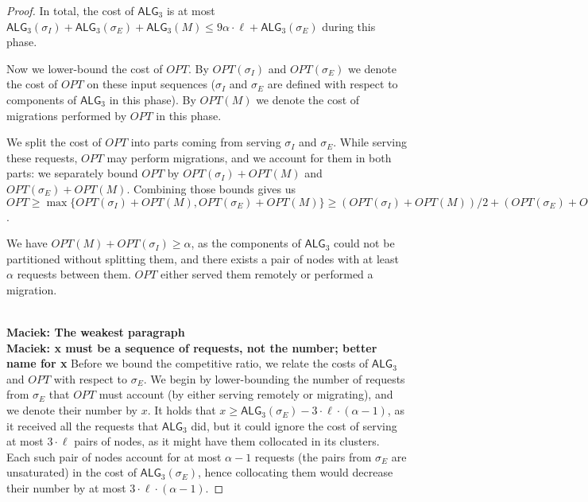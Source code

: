 \documentclass[manuscript,screen=true]{acmart}
\newcommand{\OPT}{\mathit{OPT}}
\newcommand{\TAlg}{{\ensuremath{\textsf{ALG}_{3}}}\xspace} %
\newcommand\maciek[1]{\color{brown}\textbf{\\ Maciek: #1}\color{black}}
\begin{document}
\begin{proof}
  In total, the cost of \TAlg is at most $\TAlg(\sigma_I) + \TAlg(\sigma_E) + \TAlg(M) \leq 9\alpha\cdot \ell + \TAlg(\sigma_E)$ during this phase.

  \medskip

  Now we lower-bound the cost of $\OPT$.
  By $\OPT(\sigma_I)$ and $\OPT(\sigma_E)$ we denote the cost of $\OPT$ on these input sequences ($\sigma_I$ and $\sigma_E$ are defined with respect to components of \TAlg in this phase).
  By $\OPT(M)$ we denote the cost of migrations performed by $\OPT$ in this phase.
  
  We split the cost of $\OPT$ into parts coming from serving $\sigma_I$ and $\sigma_E$.
  While serving these requests, $\OPT$ may perform migrations, and we account for them in both parts: we separately bound $\OPT$ by $\OPT(\sigma_I) + \OPT(M)$ and $\OPT(\sigma_E) + \OPT(M)$.
  Combining those bounds gives us $\OPT \geq \max\{\OPT(\sigma_I) + \OPT(M), \OPT(\sigma_E) + \OPT(M)\} \geq (\OPT(\sigma_I) + \OPT(M)) / 2 + (\OPT(\sigma_E) + \OPT(M)) / 2$.


  We have $OPT(M) + OPT(\sigma_I) \geq \alpha$, as the components of \TAlg{} could not be partitioned without splitting them, and there exists a pair of nodes with at least $\alpha$ requests between them.
  $\OPT$ either served them remotely or performed a migration.

  \medskip
  \maciek{The weakest paragraph}
  \maciek{x must be a sequence of requests, not the number; better name for x}
  Before we bound the competitive ratio, we relate the costs of $\TAlg$ and $\OPT$ with respect to $\sigma_E$.
  We begin by lower-bounding the number of requests from $\sigma_E$ that $\OPT$ must account (by either serving remotely or migrating), and we denote their number by $x$.
  It holds that $x \geq \TAlg(\sigma_E) - 3\cdot\ell\cdot(\alpha - 1)$, as it received all the requests that \TAlg did, but it could ignore the cost of serving at most $3\cdot\ell$ pairs of nodes, as it might have them collocated in its clusters.
  Each such pair of nodes account for at most $\alpha-1$ requests (the pairs from $\sigma_E$ are unsaturated) in the cost of $\TAlg(\sigma_E)$, hence collocating them would decrease their number by at most $3\cdot\ell\cdot(\alpha - 1)$.


\end{proof}
\end{document}
